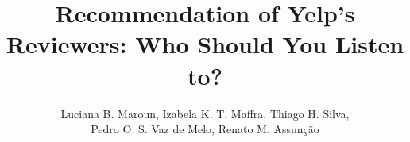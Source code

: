 \documentclass[12pt]{article}
\title{Recommendation of Yelp's Reviewers: Who Should You Listen to?}
\author{Luciana B. Maroun\inst{1}, Izabela K. T. Maffra\inst{1}, Thiago H. Silva\inst{1},\\
  Pedro O. S. Vaz de Melo\inst{1}, Renato M. Assun\c{c}\~{a}o\inst{1}}
\begin{document}
 

\maketitle

\renewcommand{\figurename}{Figure}
\renewcommand{\tablename}{Table}
















\renewcommand\refname{References}

\end{document}
